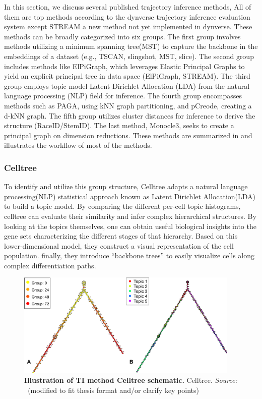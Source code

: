 In this section, we discuss several published trajectory inference methods, All of them are top methods according to the dynverse trajectory inference evaluation system\citep{saelens2019comparison} except STREAM a new method not yet implemented in dynverse. These methods can be broadly categorized into six groups. The first group involves methods utilizing a minimum spanning tree(MST) to capture the backbone in the embeddings of a dataset (e.g., TSCAN, slingshot, MST, slice). The second group includes methods like ElPiGraph, which leverages Elastic Principal Graphs to yield an explicit principal tree in data space (ElPiGraph, STREAM). The third group employs topic model Latent Dirichlet Allocation (LDA) from the natural language processing (NLP) field for inference. The fourth group encompasses methods such as PAGA, using kNN graph partitioning, and pCreode, creating a d-kNN graph. The fifth group utilizes cluster distances for inference to derive the structure (RaceID/StemID). The last method, Monocle3, seeks to create a principal graph on dimension reductions. These methods are summarized in  and  illustrates the workflow of most of the methods.

\subsubsection{Celltree}
 To identify and utilize this group structure, Celltree\citep{duverle2016celltree} adapts a natural language processing(NLP) statistical approach known as Latent Dirichlet Allocation(LDA) to build a topic model. By comparing the different per-cell topic histograms, celltree can evaluate their similarity and infer complex hierarchical structures. By looking at the topics themselves, one can obtain useful biological insights into the gene sets characterizing the different stages of that hierarchy. Based on this lower-dimensional model, they construct a visual representation of the cell population. finally, they introduce “backbone trees” to easily visualize cells along complex differentiation paths.
 
\begin{figure}[ht!]
	\centering
	\includegraphics[width=0.95\textwidth]{TI_Alg_celltree/fig}
	\vspace{0.1cm}
	\caption[Illustration of TI method Celltree schematic.]{\textbf{Illustration of TI method Celltree schematic.} Celltree. \emph{Source: ~\cite{duverle2016celltree}}(modified to fit thesis format and/or clarify key points)
	}
	\label{fig:TI_Alg_celltree}
\end{figure}


